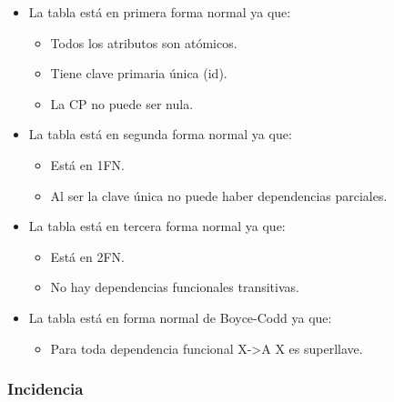 \documentclass[12pt,a4paperpaper,]{report}
\providecommand{\tightlist}{%
  \setlength{\itemsep}{0pt}\setlength{\parskip}{0pt}}
\begin{document}
\begin{itemize}
\tightlist
\item
  La tabla está en primera forma normal ya que:

  \begin{itemize}
  \tightlist
  \item
    Todos los atributos son atómicos.
  \item
    Tiene clave primaria única (id).
  \item
    La CP no puede ser nula.
  \end{itemize}
\item
  La tabla está en segunda forma normal ya que:

  \begin{itemize}
  \tightlist
  \item
    Está en 1FN.
  \item
    Al ser la clave única no puede haber dependencias parciales.
  \end{itemize}
\item
  La tabla está en tercera forma normal ya que:

  \begin{itemize}
  \tightlist
  \item
    Está en 2FN.
  \item
    No hay dependencias funcionales transitivas.
  \end{itemize}
\item
  La tabla está en forma normal de Boyce-Codd ya que:

  \begin{itemize}
  \tightlist
  \item
    Para toda dependencia funcional X-\textgreater{}A X es superllave.
  \end{itemize}
\end{itemize}

\subsubsection{Incidencia}\label{incidencia}
\end{document}
